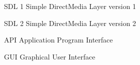 \begin{siglas}
  \item[SDL 1] Simple DirectMedia Layer version 1
  \item[SDL 2] Simple DirectMedia Layer version 2
  \item[API] Application Program Interface
  \item[GUI] Graphical User Interface
\end{siglas}
%